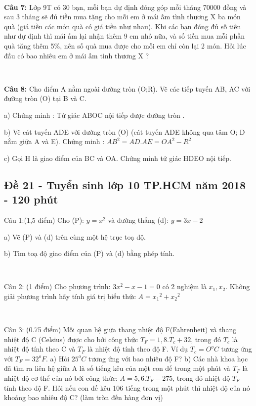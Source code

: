 \documentclass[12pt]{article}
\begin{document}
\   

\textbf{Câu 7:} Lớp 9T có 30 bạn, mỗi bạn dự định đóng góp mỗi tháng 70000 đồng và sau 3 tháng sẽ đủ tiền mua tặng cho mỗi em ở mái ấm tình thương X ba món quà (giá tiền các món quà có giá tiền như nhau). Khi các bạn đóng đủ số tiền như dự định thì mái ấm lại nhận thêm 9 em nhỏ nữa, và số tiền mua mỗi phần quà tăng thêm 5\%, nên số quà mua được cho mỗi em chỉ còn lại 2 món. Hỏi lúc đầu có bao nhiêu em ở mái ấm tình thương X ? \par

\  

\textbf{Câu 8:} Cho điểm A nằm ngoài đường tròn (O;R). Vẽ các tiếp tuyến AB, AC với đường tròn (O) tại B và C. \par
a) Chứng minh : Tứ giác ABOC nội tiếp được đường tròn .\par
b) Vẽ cát tuyến ADE với đường tròn (O) (cát tuyến ADE không qua tâm O; D nằm giữa A và E). Chứng minh : $AB^2 = AD.AE = OA^2 - R^2$ \par
c) Gọi H là giao điểm của BC và OA. Chứng minh tứ giác HDEO nội tiếp.

\break

\subsection{Đề 21 - Tuyển sinh lớp 10 TP.HCM năm 2018 - 120 phút}

Câu 1:(1,5 điểm) Cho (P): $y = x^2$ và đường thẳng (d): $y = 3x - 2$

\newline a) Vẽ (P) và (d) trên cùng một hệ trục toạ độ.

\newline b) Tìm toạ độ giao điểm của  (P) và (d) bằng phép tính.

\

\newline Câu 2: (1 điểm) Cho phương trình: $3x^2 - x - 1 = 0$ có 2 nghiệm là $x_1, x_2$. Không giải phương trình hãy tính giá trị biểu thức $A = {x_1}^2 + {x_2}^2$

\

\newline Câu 3: (0.75 điểm)
\newline Mối quan hệ giữa thang nhiệt độ F(Fahrenheit) và thang nhiệt độ C (Celsius) được cho bởi công thức $T_F = 1,8.T_c + 32$, trong đó $T_c$ là nhiệt độ tính theo C và $T_F$ là nhiệt độ tính theo độ F. Ví dụ $T_c = O^oC$ tương ứng với $T_F = 32^oF$.
\newline a)  Hỏi $25^oC$ tương ứng với bao nhiêu độ F?
\newline b) Các nhà khoa học đã tìm ra liên hệ giữa A là số tiếng kêu của một con dế trong một phút và $T_F$ là nhiệt độ cơ thể của nó bởi công thức: $A = 5,6.T_F - 275$, trong đó nhiệt độ $T_F$ tính theo độ F. Hỏi nếu con dế kêu 106 tiếng trong một phút thì nhiệt độ của nó khoảng bao nhiêu độ C? (làm tròn đến hàng đơn vị)
\end{document}

